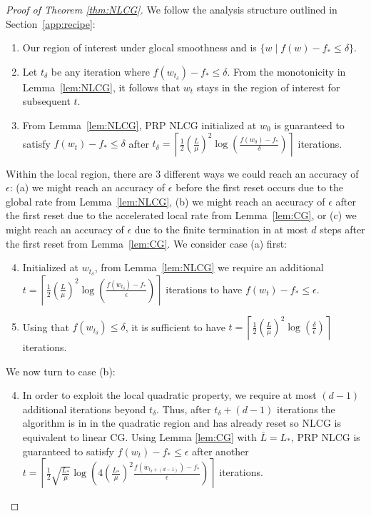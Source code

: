 \documentclass[10pt]{article} %
\begin{document}
\begin{proof}[Proof of Theorem \ref{thm:NLCG}]
We follow the analysis structure outlined in Section~\ref{app:recipe}:
\begin{enumerate}
    \item Our region of interest under glocal smoothness and is $\{w \; | \; f(w) - f_* \leq \delta\}$.
    \item Let $t_\delta$ be any iteration where $f(w_{t_\delta}) - f_* \leq \delta$. From the monotonicity in Lemma~\ref{lem:NLCG}, it follows that $w_t$ stays in the region of interest for subsequent $t$.
    \item From Lemma~\ref{lem:NLCG}, PRP NLCG initialized at $w_0$ is guaranteed to satisfy $f(w_t)-f_* \leq \delta$ after $t_\delta = \left\lceil \frac{1}{2}\left(\frac{L}{\mu}\right)^2\log\left(\frac{f(w_0) - f_*}{\delta}\right) \right\rceil$ iterations.
    \end{enumerate}
Within the local region, there are 3 different ways we could reach an accuracy of $\epsilon$: (a) we might reach an accuracy of $\epsilon$ before the first reset occurs due to the global rate from Lemma~\ref{lem:NLCG}, (b) we might reach an accuracy of $\epsilon$ after the first reset due to the accelerated local rate from Lemma~\ref{lem:CG}, or (c) we might reach an accuracy of $\epsilon$ due to the finite termination in at most $d$ steps after the first reset from Lemma~\ref{lem:CG}. We consider case (a) first:
    \begin{enumerate}
    \setcounter{enumi}{3}
\item Initialized at $w_{t_\delta}$, from Lemma~\ref{lem:NLCG} we require an additional $t = \left\lceil \frac{1}{2}\left(\frac{L}{\mu}\right)^2\log\left(\frac{f(w_{t_\delta}) - f_*}{\epsilon}\right) \right\rceil$ iterations to have $f(w_t) - f_* \leq \epsilon$.
\item Using that $f(w_{t_\delta}) \leq \delta$, it is sufficient to have $t = \left\lceil \frac{1}{2}\left(\frac{L}{\mu}\right)^2\log\left(\frac{\delta}{\epsilon}\right) \right\rceil$ iterations.
\end{enumerate}
We now turn to case (b):
\begin{enumerate}
\setcounter{enumi}{3}
\item In order to exploit the local quadratic property, we require at most $(d-1)$ additional iterations beyond $t_\delta$. Thus, after $t_\delta + (d -1)$ iterations the algorithm is in in the quadratic region and has already reset so NLCG is equivalent to linear CG. Using Lemma \ref{lem:CG} with $\bar{L} = L_{*}$, PRP NLCG is guaranteed to satisfy $f(w_t) - f_{*} \leq \epsilon$ after another $t = \left\lceil \frac 1 2\sqrt{\frac{L_{*}}{\mu}}\log\left(4\left(\frac{L_*}{\mu}\right)^2\frac{f(w_{t_\delta + (d-1)}) - f_*}{\epsilon}\right) \right\rceil$ iterations.

\end{enumerate}
\end{proof}
\end{document}
